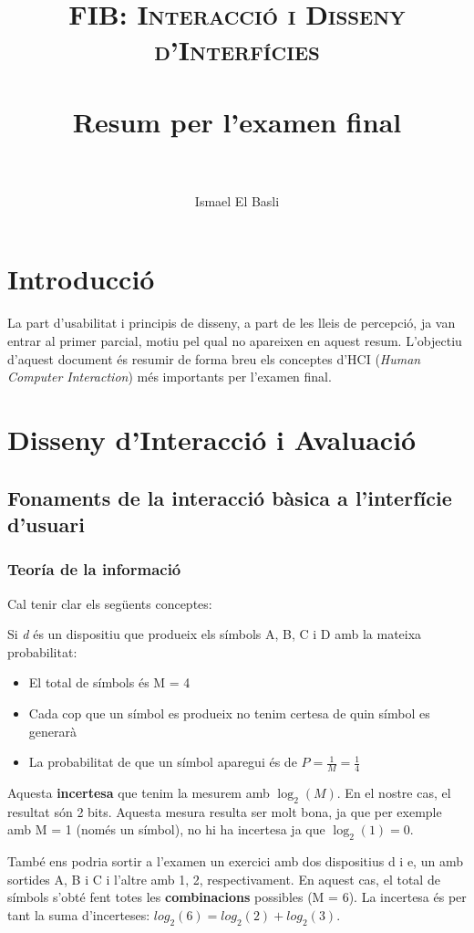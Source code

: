 \documentclass[12pt]{article}
\title{
  \normalfont \normalsize 
  \textsc{FIB: Interacció i Disseny d'Interfícies} \\ [25pt] 
  \horrule{0.5pt} \\[0.4cm] %
  \huge Resum per l'examen final \\ %
  \horrule{2pt} \\[0.5cm] %
}
\author{Ismael El Basli}
\begin{document}
    \maketitle
    \newpage
    \tableofcontents
    \newpage
    \section{Introducció}
    La part d'usabilitat i principis de disseny, a part de les lleis de percepció, ja van entrar al primer parcial, motiu pel qual no apareixen en
    aquest resum. L'objectiu d'aquest document és resumir de forma breu els conceptes d'HCI (\textit{Human Computer Interaction}) més importants
    per l'examen final.

    \section{Disseny d'Interacció i Avaluació}
    \subsection{Fonaments de la interacció bàsica a l'interfície d'usuari}
    \subsubsection{Teoría de la informació}
    Cal tenir clar els següents conceptes:
   
    Si \textit{d} és un dispositiu que produeix els símbols A, B, C i D amb la mateixa probabilitat:
    \begin{itemize}
        \item El total de símbols és M = 4
        \item Cada cop que un símbol es produeix no tenim certesa de quin símbol es generarà
        \item La probabilitat de que un símbol aparegui és de $P = \frac{1}{M} = \frac{1}{4}$
    \end{itemize}

    Aquesta \textbf{incertesa} que tenim la mesurem amb $\log_{2}(M)$. En el nostre cas, el resultat són 2 bits.
    Aquesta mesura resulta ser molt bona, ja que per exemple amb M = 1 (només un símbol), no hi ha incertesa ja que
    $\log_2(1) = 0$.
    
    \hfill \break
    També ens podria sortir a l'examen un exercici amb dos dispositius d i e, un amb sortides A, B i C i l'altre amb
    1, 2, respectivament. En aquest cas, el total de símbols s'obté fent totes les \textbf{combinacions} possibles (M = 6).
    La incertesa és per tant la suma d'incerteses: $log_2(6) = log_2(2) + log_2(3)$.
\end{document}
